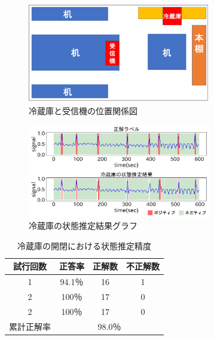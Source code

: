 \documentclass[Japanese]{dicomopapers}
\begin{document}
\begin{figure}[ht]
    \centering
    \includegraphics[width=8cm]{refrigerator_position.png}
    \caption{冷蔵庫と受信機の位置関係図}
    \label{refrigerator_position}
\end{figure}

\begin{figure}[ht]
    \centering
    \includegraphics[width=8cm]{refrigerator_graph.png}
    \caption{冷蔵庫の状態推定結果グラフ}
    \label{refrigerator_graph}
\end{figure}



\begin{table}[htb]
    \begin{center}
        \caption{冷蔵庫の開閉における状態推定精度}
        \label{refrigerator_fig}
        \begin{tabular}{|c|c|c|c|} \hline
        試行回数 & 正答率 & 正解数 & 不正解数 \\ \hline
        1 & 94.1％ & 16 & 1 \\ \hline
        2 & 100％ & 17 & 0 \\ \hline
        2 & 100％ & 17 & 0 \\ \hline \hline
        累計正解率 & \multicolumn{3}{c|}{98.0％} \\ \hline
        \end{tabular}
    \end{center}
\end{table}
\end{document}
